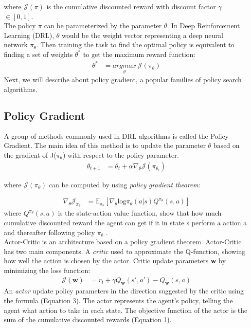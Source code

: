 \noindent where $\mathcal{J}(\pi)$ is the cumulative discounted reward with discount factor $\gamma$ $\in [0,1]$.\\
\indent The policy $\pi$ can be parameterized by the parameter $\theta$. In Deep Reinforcement Learning (DRL), $\theta$ would be the weight vector representing a deep neural network $\pi_\theta$.
Then training the task to find the optimal policy is equivalent to finding a set of weights $\theta^{*}$ to get the maximum reward function:
\begin{align}
\theta^{*}
&= \underset{\theta}{argmax} \ \mathcal{J}(\pi_\theta)
\end{align}
Next, we will describe about policy gradient, a popular families of policy search algorithms. 

\subsection{Policy Gradient}
A group of methods commonly used in DRL algorithms is called the Policy Gradient. The main idea of this method is to update the parameter $\theta$ based on the gradient of J($\pi_\theta$) with respect to the policy parameter\cite{RL-Book}.
\begin{align}
\theta_{t+1}
&= \theta_t + \alpha \nabla_\theta \mathcal{J}(\pi_{\theta_t})
\end{align}

\noindent where $\mathcal{J}(\pi_\theta)$ can be computed by using \textit{policy gradient theorem}:

\begin{align}
\nabla_{\theta} \mathcal{J}_{\pi_\theta}
&= \mathbb{E}_{\pi_\theta}[\nabla_{\theta} \text{log}  {\pi_\theta}(a|s)      Q^{\pi_\theta}(s,a)]
\end{align}
where $Q^{\pi_\theta}(s,a)$ is the state-action value function, show that how much cumulative discounted reward the agent can get if it in state s perform a action a and thereafter following policy $\pi_\theta$ . \\

Actor-Critic is an architecture based on a policy gradient theorem. Actor-Critic has two main components. A \textit{critic} used to approximate the Q-function, showing how well the action is chosen by the actor. Critic update parameters \textbf{w} by minimizing the loss function:
\begin{align}
\mathcal{J}(\textbf{w})
&= r_t + \gamma Q_\textbf{w} (s',a') - Q_\textbf{w} (s,a)
\end{align}
An \textit{actor} update policy parameters in the direction suggested by the critic using the formula (Equation 3). The actor represents the agent's policy, telling the agent what action to take in each state. The objective function of the actor is the sum of the cumulative discounted rewards (Equation 1).
